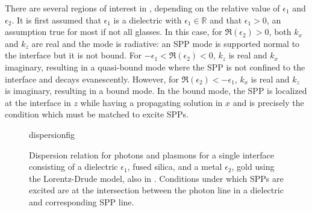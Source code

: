 There are several regions of interest in ,
depending on the relative value of $\epsilon_1$ and $\epsilon_2$.  It is
first assumed that $\epsilon_1$ is a dielectric with
$\epsilon_1\in\mathbb{R}$ and that $\epsilon_1 > 0$, an assumption true for
most if not all glasses.  In this case, for $\Re(\epsilon_2)>0$, both $k_x$
and $k_z$ are real and the mode is radiative: an SPP mode is supported
normal to the interface but it is not bound.  For
$-\epsilon_1<\Re(\epsilon_2)<0$, $k_z$ is real and $k_x$ imaginary,
resulting in a quasi-bound mode where the SPP is not confined to the
interface and decays evanescently.  However, for
$\Re(\epsilon_2)<-\epsilon_1$, $k_x$ is real and $k_z$ is imaginary,
resulting in a bound mode.  In the bound mode, the SPP is localized at the
interface in $z$ while having a propagating solution in $x$ and is
precisely the condition which must be matched to excite SPPs.
\begin{figure}[ht]
  \centering
  {dispersionfig}
  \caption{Dispersion relation for photons and plasmons for a single interface consisting of a dielectric $\epsilon_1$, fused silica, and a metal $\epsilon_2$, gold using the Lorentz-Drude model, also in . Conditions under which SPPs are excited are at the intersection between the photon line in a dielectric and corresponding SPP line.}
\label{fig:dispersionrelation}
\end{figure}
